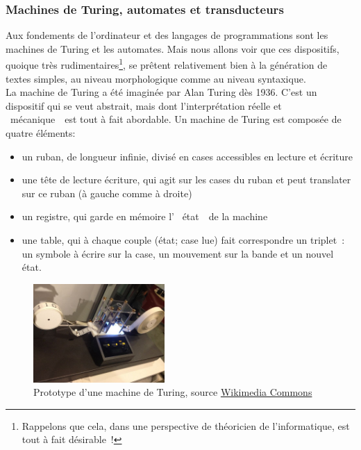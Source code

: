 \documentclass{article}
\begin{document}
			\subsubsection{Machines de Turing, automates et transducteurs}\label{automates}
				Aux fondements de l'ordinateur et des langages de programmations sont les machines de Turing et les automates. Mais nous allons voir que ces dispositifs, quoique très rudimentaires\footnote{Rappelons que cela, dans une perspective de théoricien de l'informatique, est tout à fait désirable~!}, se prêtent relativement bien à la génération de textes simples, au niveau morphologique comme au niveau syntaxique.\\
				
				La machine de Turing a été imaginée par Alan Turing dès 1936. C'est un dispositif qui se veut abstrait, mais dont l'interprétation réelle et \guillemotleft~mécanique~\guillemotright~est tout à fait abordable. Un machine de Turing est composée de quatre éléments:
				\vspace{2mm}
				\begin{itemize}
					\item un ruban, de longueur infinie, divisé en cases accessibles en lecture et écriture
					\item une tête de lecture écriture, qui agit sur les cases du ruban et peut translater sur ce ruban (à gauche comme à droite)
					\item un registre, qui garde en mémoire l' \guillemotleft~état~\guillemotright~de la machine
					\item une table, qui à chaque couple (état; case lue) fait correspondre un triplet~: un symbole à écrire sur la case, un mouvement sur la bande et un nouvel état.
				\end{itemize}
				\vspace{2mm}
				\begin{figure}[H]
					\centering
					\includegraphics[width=5cm]{turing_machine.jpg}
					\caption{Prototype d'une machine de Turing, source \href{https://commons.wikimedia.org/wiki/File:Model\_of\_a\_Turing\_machine.jpg}{Wikimedia Commons}}\footnotemark
				\end{figure}
\end{document}
